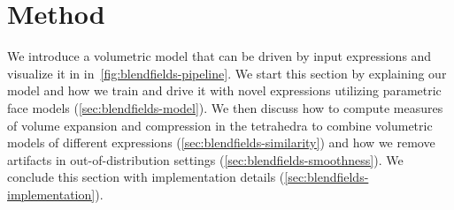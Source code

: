 
\section{Method}
  \label{sec:blendifleds-method}

  We introduce a volumetric model that can be driven by input expressions and
  visualize it in in~\cref{fig:blendfields-pipeline}.
  We start this section by explaining our model and how we train and drive it
  with novel expressions utilizing parametric face models
  (\cref{sec:blendfields-model}).
  We then discuss how to compute measures of volume expansion and compression in
  the tetrahedra to combine volumetric models of different expressions
  (\cref{sec:blendfields-similarity}) and how we remove artifacts in
  out-of-distribution settings (\cref{sec:blendfields-smoothness}).
  We conclude this section with implementation details
  (\cref{sec:blendfields-implementation}).


